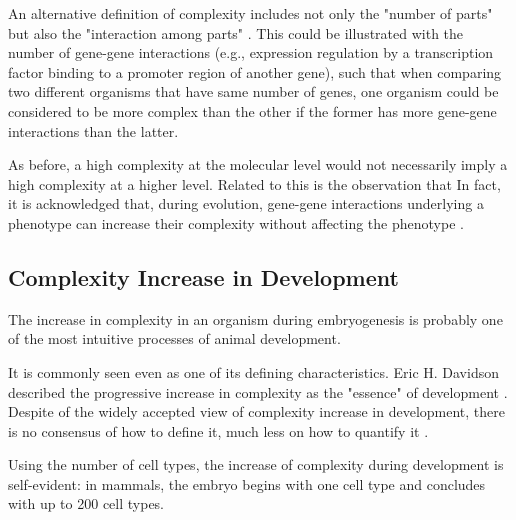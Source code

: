 An alternative definition of complexity includes not only the "number of parts" but also the "interaction among parts" 
	\citep{McShea1996,Arthur2010}.
This could be illustrated with the number of gene-gene interactions (e.g., expression regulation by a transcription factor binding to a promoter region of another gene),
such that when comparing two different organisms that have same number of genes, 
one organism could be considered to be more complex than the other if the former has more gene-gene interactions than the latter.

As before, a high complexity at the molecular level would not necessarily imply a high complexity at a higher level. 
Related to this is the observation that 
In fact, it is acknowledged that, during evolution, gene-gene interactions underlying a phenotype
can increase their complexity without affecting the phenotype 
	\citep{Muller1999,True2001,Salazar-Ciudad2009}.


\subsection{Complexity Increase in Development}

The increase in complexity in an organism during embryogenesis is probably one of the most intuitive processes of animal development.

It is commonly seen even as one of its defining characteristics.
Eric H. Davidson described the progressive increase in complexity as the "essence" of development \citep{Davidson2001}. Despite of the widely accepted view of complexity increase in development, there is no consensus of how to define it, much less on how to quantify it \citep{susan2000ontogeny}.


Using the number of cell types, the increase of complexity during development is self-evident: in mammals, the embryo begins with one cell type and concludes with up to 200 cell types. 


